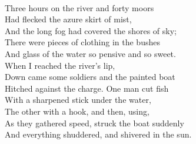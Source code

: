 \documentclass[smalldemyvopaper,11pt,twoside,onecolumn,openright,extrafontsizes]{memoir}
\begin{document}
\\Three hours on the river and forty moors
\\Had flecked the azure skirt of mist,
\\And the long fog had covered the shores of sky;
\\There were pieces of clothing in the bushes
\\And glass of the water so pensive and so sweet.
\\When I reached the river's lip,
\\Down came some soldiers and the painted boat
\\Hitched against the charge. One man cut fish
\\With a sharpened stick under the water,
\\The other with a hook, and then, using,
\\As they gathered speed, struck the boat suddenly
\\And everything shuddered, and shivered in the sun.
\end{document}
